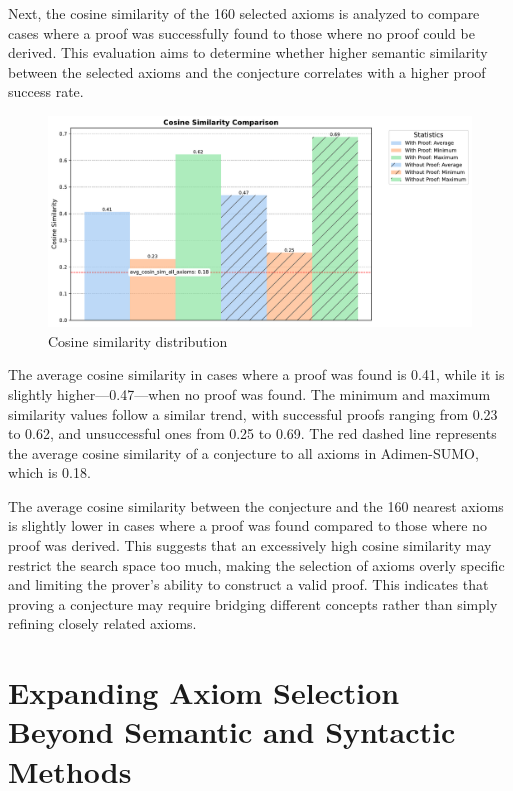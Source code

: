 \documentclass[english,version-2020-11]{uzl-thesis}
\begin{document}
Next, the cosine similarity of the 160 selected axioms is analyzed to compare cases where a proof was successfully found to those where no proof could be derived. This evaluation aims to determine whether higher semantic similarity between the selected axioms and the conjecture correlates with a higher proof success rate.

\begin{figure}[h!]
    \centering
    \includegraphics[width=\textwidth]{cosine_similarity_mini_noAdded_summary.pdf}
    \caption{Cosine similarity distribution}
    \label{fig:cosine_similarity}
\end{figure}
\FloatBarrier

The average cosine similarity in cases where a proof was found is 0.41, while it is slightly higher—0.47—when no proof was found. The minimum and maximum similarity values follow a similar trend, with successful proofs ranging from 0.23 to 0.62, and unsuccessful ones from 0.25 to 0.69. The red dashed line represents the average cosine similarity of a conjecture to all axioms in Adimen-SUMO, which is 0.18.

The average cosine similarity between the conjecture and the 160 nearest axioms is slightly lower in cases where a proof was found compared to those where no proof was derived. This suggests that an excessively high cosine similarity may restrict the search space too much, making the selection of axioms overly specific and limiting the prover's ability to construct a valid proof. This indicates that proving a conjecture may require bridging different concepts rather than simply refining closely related axioms.


\section{Expanding Axiom Selection Beyond Semantic and Syntactic Methods}
\end{document}

